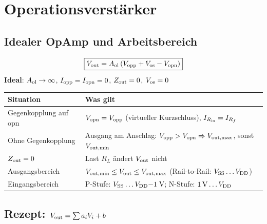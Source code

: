 \section{Operationsverstärker}\label{sec:opamp}

\subsection{Idealer OpAmp und Arbeitsbereich}\label{sec:opamp-ideal}

\begin{minipage}[c]{0.42\columnwidth}
	\centering
	\resizebox{\columnwidth}{!}{}
\end{minipage}
\hfill
\begin{minipage}[c]{0.56\columnwidth}
	$$ \boxed{ V_{\rm out} = A_{\rm ol}\,(V_{\rm opp} + V_{\rm os} - V_{\rm opn}) } $$
	\textbf{Ideal}: \; $A_{\rm ol}\to\infty$, \; $I_{\rm opp}=I_{\rm opn}=0$, \; $Z_{\rm out}=0$, \; $V_{\rm os}=0$
\end{minipage}

\vspace{4pt}
{\renewcommand{\arraystretch}{1.45}
\begin{tabularx}{\columnwidth}{@{}l X@{}}
	\toprule
	\textbf{Situation}        & \textbf{Was gilt} \\ \midrule
	Gegenkopplung auf opn     & $V_{\rm opn} = V_{\rm opp}$ (virtueller Kurzschluss), \; $I_{R_{\rm in}} = I_{R_f}$ \\
	Ohne Gegenkopplung        & Ausgang am Anschlag: $V_{\rm opp} > V_{\rm opn} \Rightarrow V_{\rm out,max}$, sonst $V_{\rm out,min}$ \\
	$Z_{\rm out} = 0$         & Last $R_L$ ändert $V_{\rm out}$ nicht \\
	Ausgangsbereich           & $V_{\rm out,min} \le V_{\rm out} \le V_{\rm out,max}$ \; (Rail-to-Rail: $V_{\rm SS}\dots V_{\rm DD}$) \\
	Eingangsbereich           & P-Stufe: $V_{\rm SS}\dots V_{\rm DD}{-}1\,$V; \; N-Stufe: $1\,{\rm V}\dots V_{\rm DD}$ \\ \bottomrule
\end{tabularx}}


\subsection{Rezept: $V_{\rm out} = \sum a_i V_i + b$}\label{sec:opamp-rezept}

